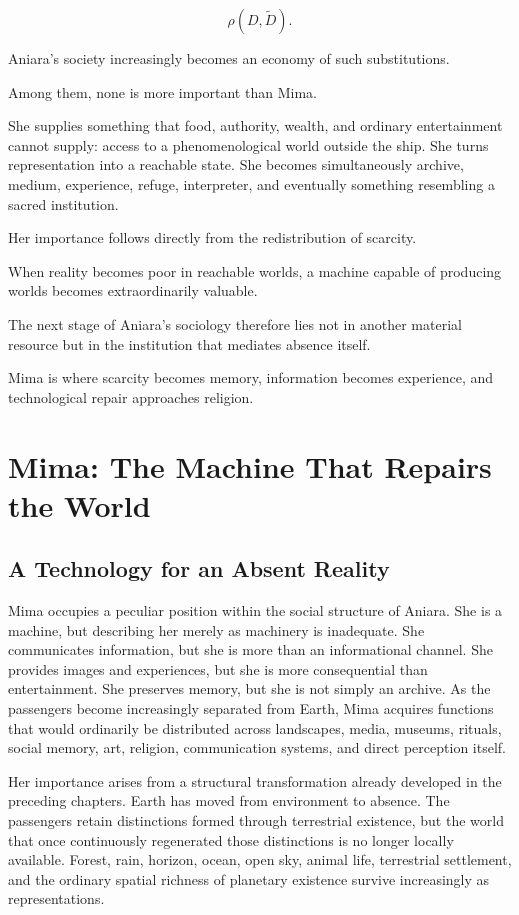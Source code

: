 \documentclass[11pt,oneside]{book}
\theoremstyle{definition}
\theoremstyle{remark}
\begin{document}
\[
\rho(D,\widetilde D).
\]

Aniara's society increasingly becomes an economy of such substitutions.

Among them, none is more important than Mima.

She supplies something that food, authority, wealth, and ordinary entertainment cannot supply: access to a phenomenological world outside the ship. She turns representation into a reachable state. She becomes simultaneously archive, medium, experience, refuge, interpreter, and eventually something resembling a sacred institution.

Her importance follows directly from the redistribution of scarcity.

When reality becomes poor in reachable worlds, a machine capable of producing worlds becomes extraordinarily valuable.

The next stage of Aniara's sociology therefore lies not in another material resource but in the institution that mediates absence itself.

Mima is where scarcity becomes memory, information becomes experience, and technological repair approaches religion.

\chapter{Mima: The Machine That Repairs the World}

\section{A Technology for an Absent Reality}

Mima occupies a peculiar position within the social structure of Aniara. She is a machine, but describing her merely as machinery is inadequate. She communicates information, but she is more than an informational channel. She provides images and experiences, but she is more consequential than entertainment. She preserves memory, but she is not simply an archive. As the passengers become increasingly separated from Earth, Mima acquires functions that would ordinarily be distributed across landscapes, media, museums, rituals, social memory, art, religion, communication systems, and direct perception itself.

Her importance arises from a structural transformation already developed in the preceding chapters. Earth has moved from environment to absence. The passengers retain distinctions formed through terrestrial existence, but the world that once continuously regenerated those distinctions is no longer locally available. Forest, rain, horizon, ocean, open sky, animal life, terrestrial settlement, and the ordinary spatial richness of planetary existence survive increasingly as representations.
\end{document}
